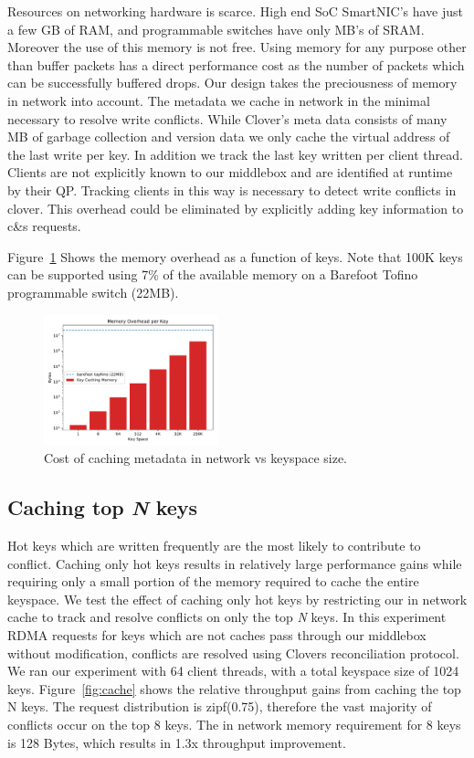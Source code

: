 Resources on networking hardware is scarce. High end SoC SmartNIC's
have just a few GB of RAM, and programmable switches have only MB's of
SRAM. Moreover the use of this memory is not free. Using memory for
any purpose other than buffer packets has a direct performance cost as
the number of packets which can be successfully buffered drops. Our
design takes the preciousness of memory in network into account. The
metadata we cache in network in the minimal necessary to resolve write
conflicts. While Clover's meta data consists of many MB of garbage
collection and version data we only cache the virtual address of the
last write per key. In addition we track the last key written per
client thread. Clients are not explicitly known to our middlebox and
are identified at runtime by their QP. Tracking clients in this way is
necessary to detect write conflicts in clover. This overhead could be
eliminated by explicitly adding key information to c\&s requests.

Figure~\ref{fig:memory} Shows the memory overhead as a function of
keys. Note that 100K keys can be supported using 7\% of the available
memory on a Barefoot Tofino programmable switch (22MB).

\begin{figure}
    \includegraphics[width=0.45\textwidth]{fig/memory.pdf}
    \caption{Cost of caching metadata in network vs keyspace size.}
    \label{fig:memory}
\end{figure}

\subsection{Caching top \textit{N} keys} 
Hot keys which are written frequently are the most likely to
contribute to conflict. Caching only hot keys results in relatively
large performance gains while requiring only a small portion of the
memory required to cache the entire keyspace. We test the effect of
caching only hot keys by restricting our in network cache to track and
resolve conflicts on only the top \textit{N} keys. In this experiment
RDMA requests for keys which are not caches pass through our middlebox
without modification, conflicts are resolved using Clovers
reconciliation protocol. We ran our experiment with 64 client threads,
with a total keyspace size of 1024 keys. Figure~\ref{fig:cache} shows
the relative throughput gains from caching the top N keys. The request
distribution is zipf(0.75), therefore the vast majority of conflicts
occur on the top 8 keys. The in network memory requirement for 8 keys
is 128 Bytes, which results in 1.3x throughput improvement.

